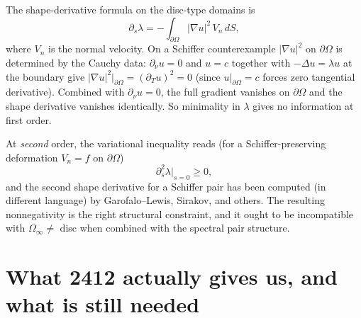 \documentclass[11pt]{article}
\newcommand{\Om}{\Omega}
\newcommand{\1}{\mathbf 1}
\newcommand{\nor}{\partial_\nu}
\begin{document}
The shape-derivative formula on the disc-type domains is
\[
    \partial_s\lambda=-\int_{\partial\Om}|\nabla u|^2\,V_n\,dS,
\]
where $V_n$ is the normal velocity. On a Schiffer counterexample
$|\nabla u|^2$ on $\partial\Om$ is determined by the Cauchy data:
$\nor u=0$ and $u=c$ together with $-\Delta u=\lambda u$ at the
boundary give
$|\nabla u|^2|_{\partial\Om}=(\partial_T u)^2=0$ (since $u|_{\partial\Om}=c$
forces zero tangential derivative). Combined with $\nor u=0$, the
full gradient vanishes on $\partial\Om$ and the shape derivative
vanishes identically. So minimality in $\lambda$ gives no information
at first order.

At \emph{second} order, the variational inequality reads (for a
Schiffer-preserving deformation $V_n=f$ on $\partial\Om$)
\[
    \partial_s^2\lambda\big|_{s=0}\ge 0,
\]
and the second shape derivative for a Schiffer pair has been computed
(in different language) by Garofalo--Lewis, Sirakov, and others. The
resulting nonnegativity is the right structural constraint, and it
ought to be incompatible with $\Om_\infty\ne$ disc when combined with
the spectral pair structure.

\section{What 2412 actually gives us, and what is still needed}
\end{document}
